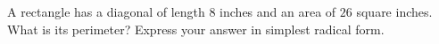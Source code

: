 A rectangle has a diagonal of length $8$ inches and an area of $26$ square inches. What is its perimeter? Express your answer in simplest radical form.
